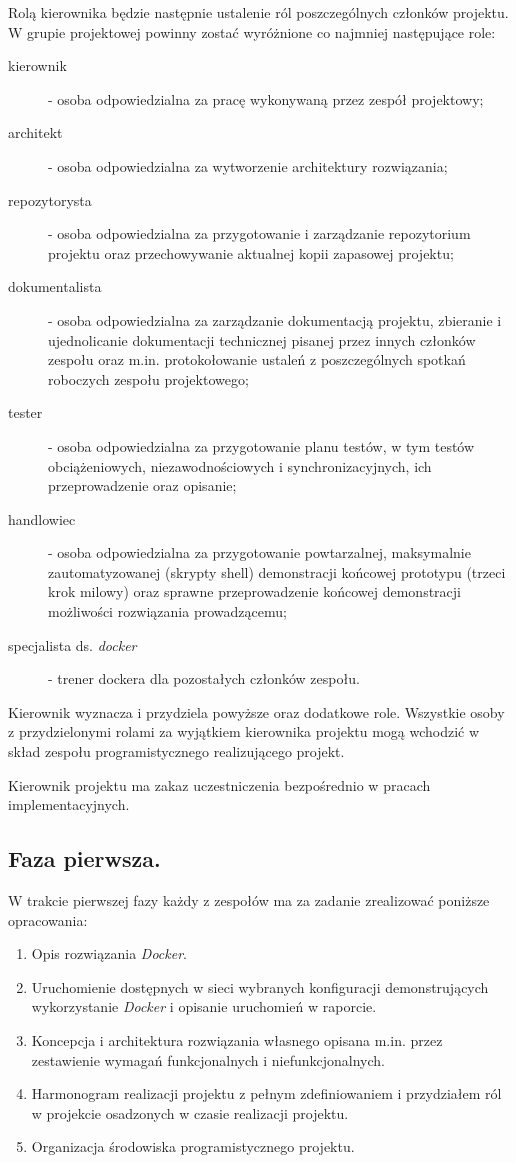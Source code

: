 \documentclass[a4paper,11pt]{article}
\begin{document}
  Rolą kierownika będzie następnie ustalenie ról poszczególnych członków projektu.
  W grupie projektowej powinny zostać wyróżnione co najmniej następujące role:
  
  \begin{description}
    \item[kierownik] - osoba odpowiedzialna za pracę wykonywaną przez zespół projektowy;
    \item[architekt] - osoba odpowiedzialna za wytworzenie architektury rozwiązania;
    \item[repozytorysta] - osoba odpowiedzialna za przygotowanie i zarządzanie repozytorium projektu oraz przechowywanie aktualnej kopii zapasowej projektu;
    \item[dokumentalista] - osoba odpowiedzialna za zarządzanie dokumentacją projektu, zbieranie i ujednolicanie dokumentacji technicznej pisanej przez innych członków zespołu
      oraz m.in. protokołowanie ustaleń z poszczególnych spotkań roboczych zespołu projektowego;
    \item[tester] - osoba odpowiedzialna za przygotowanie planu testów, w tym testów obciążeniowych, niezawodnościowych i synchronizacyjnych, ich przeprowadzenie oraz opisanie;
    \item[handlowiec] - osoba odpowiedzialna za przygotowanie powtarzalnej, maksymalnie zautomatyzowanej (skrypty shell) demonstracji końcowej prototypu (trzeci krok milowy)
      oraz sprawne przeprowadzenie końcowej demonstracji możliwości rozwiązania prowadzącemu;
    \item[specjalista ds. \textit{docker}] - trener dockera dla pozostałych członków zespołu.
  \end{description}
  
  Kierownik wyznacza i przydziela powyższe oraz dodatkowe role.
  Wszystkie osoby z przydzielonymi rolami za wyjątkiem kierownika projektu mogą wchodzić w skład zespołu programistycznego realizującego projekt. 
  
  Kierownik projektu ma zakaz uczestniczenia bezpośrednio w pracach implementacyjnych.
  
\subsection{Faza pierwsza.}
  W trakcie pierwszej fazy każdy z zespołów ma za zadanie zrealizować poniższe opracowania:
  \begin{enumerate}
    \item Opis rozwiązania \textit{Docker}.
    \item Uruchomienie dostępnych w sieci wybranych konfiguracji demonstrujących wykorzystanie \textit{Docker} i opisanie uruchomień w raporcie.
    \item Koncepcja i architektura rozwiązania własnego opisana m.in. przez zestawienie wymagań funkcjonalnych i niefunkcjonalnych.
    \item Harmonogram realizacji projektu z pełnym zdefiniowaniem i przydziałem ról w projekcie osadzonych w czasie realizacji projektu.
    \item Organizacja środowiska programistycznego projektu.
  \end{enumerate}
  
\end{document}

